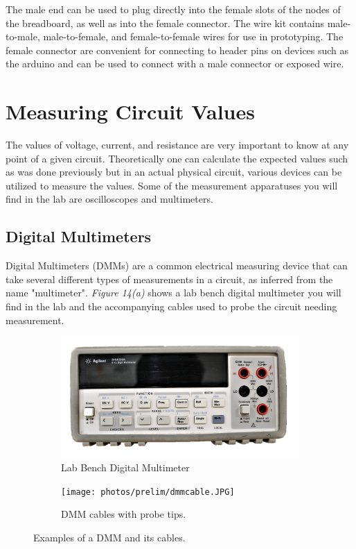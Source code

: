 \documentclass[12pt]{article}
\begin{document}
The male end can be used to plug directly into the female slots of the nodes of the breadboard, as well as into the female connector. The wire kit contains male-to-male, male-to-female, and female-to-female wires for use in prototyping. The female connector are convenient for connecting to header pins on devices such as the arduino and can be used to connect with a male connector or exposed wire.

\section{Measuring Circuit Values}

The values of voltage, current, and resistance are very important to know at any point of a given circuit. Theoretically one can calculate the expected values such as was done previously but in an actual physical circuit, various devices can be utilized to measure the values. Some of the measurement apparatuses you will find in the lab are oscilloscopes and multimeters.

\subsection{Digital Multimeters}

Digital Multimeters (DMMs) are a common electrical measuring device that can take several different types of measurements in a circuit, as inferred from the name "multimeter". \textit{Figure 14(a)} shows a lab bench digital multimeter you will find in the lab and the accompanying cables used to probe the circuit needing measurement.

\begin{figure}[H]
\begin{subfigure}{.5\textwidth}
  \centering
  \includegraphics[width=1\linewidth]{photos/prelim/dmm-agilent.png}
  \caption{Lab Bench Digital Multimeter}
\end{subfigure}%
\begin{subfigure}{.5\textwidth}
  \centering
  \texttt{[image: photos/prelim/dmmcable.JPG]}
  \caption{DMM cables with probe tips.}
\end{subfigure}
\caption{Examples of a DMM and its cables.}
\end{figure}
\end{document}

